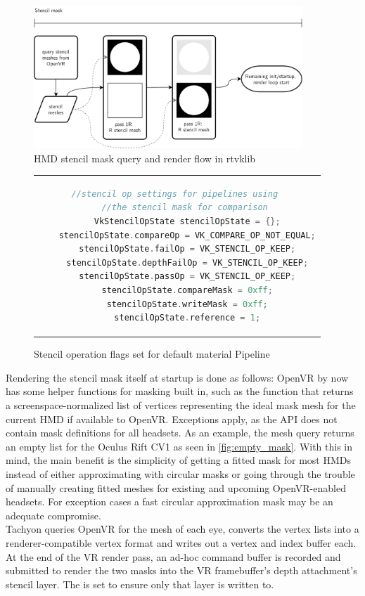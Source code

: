 \begin{figure}[htb]
  \centering
  \includegraphics[width=0.9\textwidth]{pictures/StencilMask}
  \caption{HMD stencil mask query and render flow in \gls{rtvklib}} \label{fig:StencilMask}
\end{figure}

\begin{figure}[htb]
  \centering
  \begin{tabular}{c}
  \begin{lstlisting}[language=C++]
	//stencil op settings for pipelines using 
	//the stencil mask for comparison 
	VkStencilOpState stencilOpState = {};
	stencilOpState.compareOp = VK_COMPARE_OP_NOT_EQUAL;
	stencilOpState.failOp = VK_STENCIL_OP_KEEP;
	stencilOpState.depthFailOp = VK_STENCIL_OP_KEEP;
	stencilOpState.passOp = VK_STENCIL_OP_KEEP;
	stencilOpState.compareMask = 0xff;
	stencilOpState.writeMask = 0xff;
	stencilOpState.reference = 1;
	\end{lstlisting}
  \end{tabular}
  \caption[Material pipeline stencil operation flags]{Stencil operation flags set for default material Pipeline}\label{fig:lst_StencilOpState_MaterialPipeline}
\end{figure}

Rendering the stencil mask itself at startup is done as follows: 
OpenVR by now has some helper functions for masking built in, such as the  function that returns a screenspace-normalized list of vertices representing the ideal mask mesh for the current HMD if available to OpenVR. Exceptions apply, as the API does not contain mask definitions for all headsets. As an example, the mesh query returns an empty list for the Oculus Rift CV1 as seen in \autoref{fig:empty_mask}. With this in mind, the main benefit is the simplicity of getting a fitted mask for most HMDs instead of either approximating with circular masks or going through the trouble of manually creating fitted meshes for existing and upcoming OpenVR-enabled headsets. For exception cases a fast circular approximation mask may be an adequate compromise. \\
\gls{Tachyon} queries OpenVR for the mesh of each eye, converts the vertex lists into a renderer-compatible vertex format and writes out a vertex and index buffer each. 
At the end of the \gls{VR} render pass, an ad-hoc command buffer is recorded and submitted to render the two masks into the \gls{VR} framebuffer's depth attachment's stencil layer. The  is set to ensure only that layer is written to. \\

